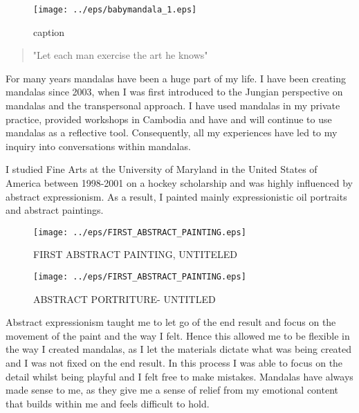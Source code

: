 \begin{figure}[htbp]
\begin{center}
\texttt{[image: ../eps/babymandala\_1.eps]} 
\caption{caption}
\label{label}
\end{center}
\end{figure}



\begin{quote}
"Let each man exercise the art he knows"
\end{quote}

\newpage 
For many years mandalas have been a huge part of my life. I have been creating mandalas since 2003, when I was first introduced to the Jungian perspective on mandalas and the transpersonal approach. I have used mandalas in my private practice, provided workshops in Cambodia and have and will continue to use mandalas as a reflective tool. Consequently, all my experiences have led to my inquiry into conversations within mandalas.

I studied Fine Arts at the University of Maryland in the United States of America between 1998-2001 on a hockey scholarship and was highly influenced by abstract expressionism. As a result, I painted mainly expressionistic oil portraits and abstract paintings.


\begin{figure}[htbp]
\begin{center}
\texttt{[image: ../eps/FIRST\_ABSTRACT\_PAINTING.eps]}
\caption{FIRST ABSTRACT PAINTING, UNTITELED}
\label{label}
\end{center}
\end{figure}


\begin{figure}[htbp]
\begin{center}
\texttt{[image: ../eps/FIRST\_ABSTRACT\_PAINTING.eps]}
\caption{ABSTRACT PORTRITURE- UNTITLED}
\label{label}
\end{center}
\end{figure}

Abstract expressionism taught me to let go of the end result and focus on the movement of the paint and the way I felt. Hence this allowed me to be flexible in the way I created mandalas, as I let the materials dictate what was being created and I was not fixed on the end result. In this process I was able to focus on the detail whilst being playful and I felt free to make mistakes. Mandalas have always made sense to me, as they give me a sense of relief from my emotional content that builds within me and feels difficult to hold.

